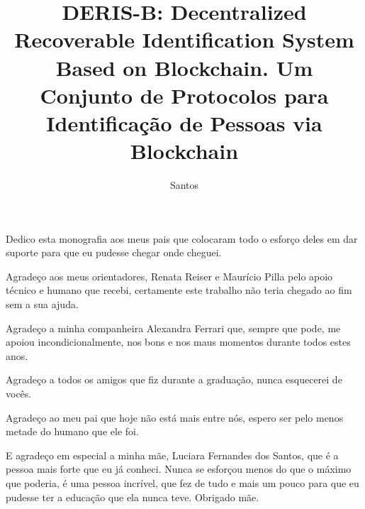 \documentclass[tcc,capa]{texufpel}
\title{DERIS-B: Decentralized Recoverable Identification System Based on Blockchain. Um Conjunto de Protocolos para Identificação de Pessoas via Blockchain}
\author{Santos}{Gustavo Fernandes dos}
\begin{document}
\renewcommand{\advisorname}{Orientadora}           %

\maketitle 

\sloppy



\begin{dedicatoria}
  Dedico esta monografia aos meus pais que colocaram todo o esforço deles em dar suporte para que eu pudesse chegar onde cheguei.
\end{dedicatoria}

\begin{agradecimentos}
  Agradeço aos meus orientadores, Renata Reiser e Maurício Pilla pelo apoio técnico e humano que recebi, certamente este trabalho não teria chegado ao fim sem a sua ajuda.
  
  Agradeço a minha companheira Alexandra Ferrari que, sempre que pode, me apoiou incondicionalmente, nos bons e nos maus momentos durante todos estes anos.
  
  Agradeço a todos os amigos que fiz durante a graduação, nunca esquecerei de vocês.
  
  Agradeço ao meu pai que hoje não está mais entre nós, espero ser pelo menos metade do humano que ele foi.
  
  E agradeço em especial a minha mãe, Luciara Fernandes dos Santos, que é a pessoa mais forte que eu já conheci. Nunca se esforçou menos do que o máximo que poderia, é uma pessoa incrível, que fez de tudo e mais um pouco para que eu pudesse ter a educação que ela nunca teve. Obrigado mãe.
\end{agradecimentos}

\end{document}

